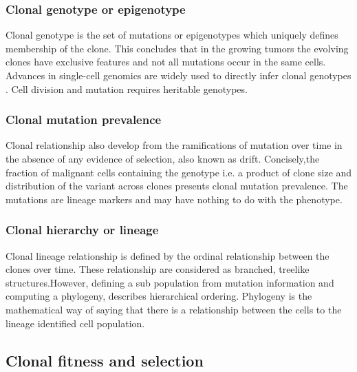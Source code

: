 \subsubsection{Clonal genotype or epigenotype}
Clonal genotype is the set of mutations or epigenotypes which uniquely defines membership of the clone. This concludes that in the growing tumors the evolving clones have exclusive features and not all mutations occur in the same cells. Advances in single-cell genomics are widely used to directly infer clonal genotypes \cite{macosko2015highly,laks2019clonal}. Cell division and mutation requires heritable genotypes.

\subsubsection{Clonal mutation prevalence}
Clonal relationship also develop from the ramifications of mutation over time in the absence of any evidence of selection, also known as drift. Concisely,the fraction of malignant cells containing the genotype i.e. a product of clone size and distribution of the variant across clones presents clonal mutation prevalence. The mutations are lineage markers and may have nothing to do with the phenotype.


\subsubsection{Clonal hierarchy or lineage}
 Clonal lineage relationship is defined by the ordinal relationship between the clones over time. These relationship are considered as branched, treelike structures.However, defining a sub population from mutation information and computing a phylogeny, describes hierarchical ordering. Phylogeny is the mathematical way of saying that there is a relationship between the cells to the lineage identified cell population.
 
\subsection{Clonal fitness and selection}

